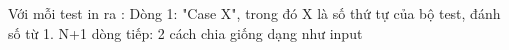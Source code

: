 Với mỗi test in ra : Dòng 1: "Case X", trong đó X là số thứ tự của bộ test, đánh số từ 1. N+1 dòng tiếp: 2 cách chia giống dạng như input